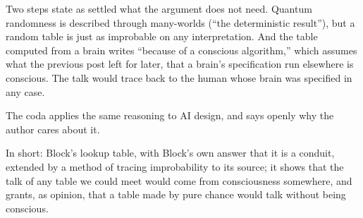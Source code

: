 \begin{afterword}
Two steps state as settled what the argument does not need. Quantum randomness is described through many-worlds (``the deterministic result''), but a random table is just as improbable on any interpretation. And the table computed from a brain writes ``because of a conscious algorithm,'' which assumes what the previous post left for later, that a brain's specification run elsewhere is conscious. The talk would trace back to the human whose brain was specified in any case.

The coda applies the same reasoning to AI design, and says openly why the author cares about it.

In short: Block's lookup table, with Block's own answer that it is a conduit, extended by a method of tracing improbability to its source; it shows that the talk of any table we could meet would come from consciousness somewhere, and grants, as opinion, that a table made by pure chance would talk without being conscious.
\end{afterword}
